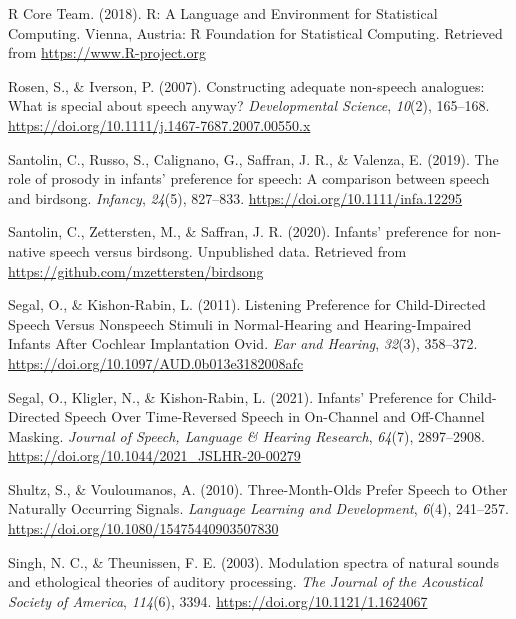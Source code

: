 \documentclass[
  english,
  man]{apa6}
\newlength{\cslhangindent}
\newlength{\cslentryspacingunit} %
\newenvironment{CSLReferences}[2] %
 {%
  \setlength{\parindent}{0pt}
  \ifodd #1
  \let\oldpar\par
  \def\par{\hangindent=\cslhangindent\oldpar}
  \fi
  \setlength{\parskip}{#2\cslentryspacingunit}
 }%
 {}
\begin{document}
\begin{CSLReferences}{1}{0}
\leavevmode{}%
R Core Team. (2018). R: {A} {Language} and {Environment} for {Statistical} {Computing}. Vienna, Austria: R Foundation for Statistical Computing. Retrieved from \url{https://www.R-project.org}

\leavevmode{}%
Rosen, S., \& Iverson, P. (2007). Constructing adequate non-speech analogues: What is special about speech anyway? \emph{Developmental Science}, \emph{10}(2), 165--168. \url{https://doi.org/10.1111/j.1467-7687.2007.00550.x}

\leavevmode{}%
Santolin, C., Russo, S., Calignano, G., Saffran, J. R., \& Valenza, E. (2019). The role of prosody in infants' preference for speech: {A} comparison between speech and birdsong. \emph{Infancy}, \emph{24}(5), 827--833. \url{https://doi.org/10.1111/infa.12295}

\leavevmode{}%
Santolin, C., Zettersten, M., \& Saffran, J. R. (2020). Infants' preference for non-native speech versus birdsong. {Unpublished} data. Retrieved from \url{https://github.com/mzettersten/birdsong}

\leavevmode{}%
Segal, O., \& Kishon-Rabin, L. (2011). Listening {Preference} for {Child}-{Directed} {Speech} {Versus} {Nonspeech} {Stimuli} in {Normal}-{Hearing} and {Hearing}-{Impaired} {Infants} {After} {Cochlear} {Implantation} {\textbar} {Ovid}. \emph{Ear and Hearing}, \emph{32}(3), 358--372. \url{https://doi.org/10.1097/AUD.0b013e3182008afc}

\leavevmode{}%
Segal, O., Kligler, N., \& Kishon-Rabin, L. (2021). Infants' {Preference} for {Child}-{Directed} {Speech} {Over} {Time}-{Reversed} {Speech} in {On}-{Channel} and {Off}-{Channel} {Masking}. \emph{Journal of Speech, Language \& Hearing Research}, \emph{64}(7), 2897--2908. \url{https://doi.org/10.1044/2021_JSLHR-20-00279}

\leavevmode{}%
Shultz, S., \& Vouloumanos, A. (2010). Three-{Month}-{Olds} {Prefer} {Speech} to {Other} {Naturally} {Occurring} {Signals}. \emph{Language Learning and Development}, \emph{6}(4), 241--257. \url{https://doi.org/10.1080/15475440903507830}

\leavevmode{}%
Singh, N. C., \& Theunissen, F. E. (2003). Modulation spectra of natural sounds and ethological theories of auditory processing. \emph{The Journal of the Acoustical Society of America}, \emph{114}(6), 3394. \url{https://doi.org/10.1121/1.1624067}


\end{CSLReferences}
\end{document}
